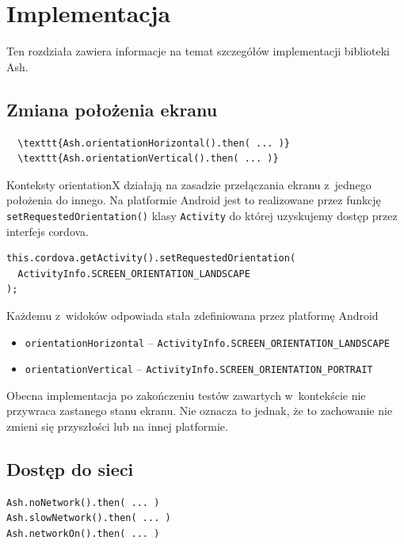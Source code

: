 \documentclass[brudnopis]{xmgr}
\begin{document}
\chapter{Implementacja}

Ten rozdziała zawiera informacje na temat szczegółów implementacji biblioteki Ash.

\section{Zmiana położenia ekranu}

\begin{lstlisting}
  \texttt{Ash.orientationHorizontal().then( ... )}   
  \texttt{Ash.orientationVertical().then( ... )} 
\end{lstlisting}

Konteksty orientationX działają na zasadzie przełączania ekranu z~jednego położenia do innego. Na platformie Android jest to realizowane przez funkcję \texttt{setRequestedOrientation()} klasy \texttt{Activity} do której uzyskujemy dostęp przez interfejs cordova. 

\begin{lstlisting}
this.cordova.getActivity().setRequestedOrientation(
  ActivityInfo.SCREEN_ORIENTATION_LANDSCAPE
);
\end{lstlisting}

Każdemu z~widoków odpowiada stała zdefiniowana przez platformę Android
\begin{itemize}
  \item \texttt{orientationHorizontal} -- \texttt{ActivityInfo.SCREEN\_ORIENTATION\_LANDSCAPE}
  \item \texttt{orientationVertical} -- \texttt{ActivityInfo.SCREEN\_ORIENTATION\_PORTRAIT}
\end{itemize}

Obecna implementacja po zakończeniu testów zawartych w~kontekście nie przywraca zastanego stanu ekranu. Nie oznacza to jednak, że to zachowanie nie zmieni się przyszłości lub na innej platformie.

\section{Dostęp do sieci}

\begin{lstlisting}
Ash.noNetwork().then( ... ) 
Ash.slowNetwork().then( ... ) 
Ash.networkOn().then( ... ) 
\end{lstlisting}
\end{document}
